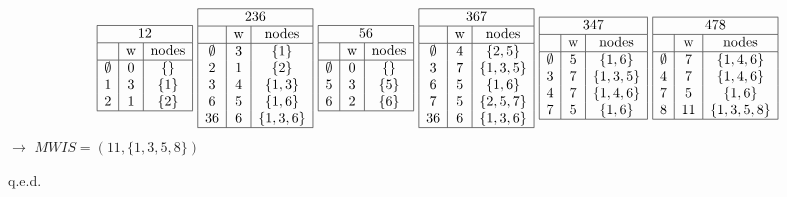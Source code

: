 \documentclass[a4paper,11pt,twoside]{scrartcl}
\newcommand{\qed}{%
	\begin{flushright}
		q.e.d.
	\end{flushright}%
	}
\begin{document}
\begin{align*}
\begin{array}{|c|c|c|}
\hline
\multicolumn{3}{|c|}{12}\\\hline
\text{ }&\text{w}&\text{nodes}\\\hline
\emptyset	& 0 & \{\}\\
1			& 3 & \{1\}\\
2			& 1 & \{2\}\\\hline
\end{array}~
\begin{array}{|c|c|c|}
\hline
\multicolumn{3}{|c|}{236}\\\hline
\text{ }&\text{w}&\text{nodes}\\\hline
\emptyset	& 3 & \{1\}\\
2			& 1 & \{2\}\\
3			& 4 & \{1,3\}\\
6			& 5 & \{1,6\}\\
36			& 6 & \{1,3,6\}\\\hline
\end{array}~
\begin{array}{|c|c|c|}
\hline
\multicolumn{3}{|c|}{56}\\\hline
\text{ }&\text{w}&\text{nodes}\\\hline
\emptyset	& 0 & \{\}\\
5			& 3 & \{5\}\\
6			& 2 & \{6\}\\\hline
\end{array}~
\begin{array}{|c|c|c|}
\hline
\multicolumn{3}{|c|}{367}\\\hline
\text{ }&\text{w}&\text{nodes}\\\hline
\emptyset	& 4 & \{2,5\}\\
3			& 7 & \{1,3,5\}\\
6			& 5 & \{1,6\}\\
7			& 5 & \{2,5,7\}\\
36			& 6 & \{1,3,6\}\\\hline
\end{array}~
\begin{array}{|c|c|c|}
\hline
\multicolumn{3}{|c|}{347}\\\hline
\text{ }&\text{w}&\text{nodes}\\\hline
\emptyset	& 5 & \{1,6\}\\
3			& 7 & \{1,3,5\}\\
4			& 7 & \{1,4,6\}\\
7			& 5 & \{1,6\}\\\hline
\end{array}~
\begin{array}{|c|c|c|}
\hline
\multicolumn{3}{|c|}{478}\\ \hline
\text{ }&\text{w}&\text{nodes}\\\hline
\emptyset	& 7 & \{1,4,6\}\\
4			& 7 & \{1,4,6\}\\
7			& 5 & \{1,6\}\\
8			& 11 & \{1,3,5,8\}\\\hline
\end{array}
\end{align*}
$\rightarrow$ $MWIS = \left( 11, \{1,3,5,8\} \right)$\qed
\end{document}
